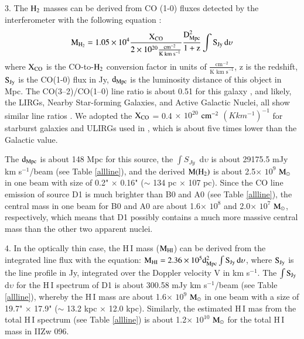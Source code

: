 \documentclass[]{aa} %
\newcommand{\km}{\rm\; km}
\newcommand{\kmps}{\hbox{$\km\s^{-1}\,$}}
\newcommand{\K}{\rm\; K}
\newcommand{\kms}{km s$^{-1}$\xspace}
\newcommand{\HI}{{\rm H\,{\scriptsize I}}\xspace}
\begin{document}
3.
The $\rm H_{2}$ masses can be derived from CO (1-0) fluxes detected by the interferometer with the following equation \citep{2017ApJ...836..130R,1991ApJ...370..172P}:
 \begin{equation}
\rm M_{H_{2}} = 1.05\times 10^{4} \frac{\rm X_{CO}}{2\times 10^{20} \frac{\textrm{cm}^{-2}}{\textrm{K km s}^{-1}}}\frac{\rm D_{Mpc}^{2}}{1+z}\int S_{Jy}\, d\upsilon
\end{equation}
 where $\rm X_{CO}$ is the CO-to-$\rm H_{2}$ conversion factor in units of $\frac{\textrm{cm}^{-2}}{\textrm{K km s}^{-1}}$, z is the redshift, $\rm S_{Jy}$ is the CO(1-0) flux in Jy, $\rm d_{Mpc}$ is the luminosity distance of this object in Mpc. The CO(3–2)/CO(1–0) line ratio is about 0.51 for this galaxy \citep{2010MNRAS.406.1364L}, and likely, the LIRGs, Nearby Star-forming Galaxies, and Active Galactic Nuclei, all show similar line ratios \citep[see][]{2010MNRAS.406.1364L,2020ApJ...889..103L}. We adopted the $\rm X_{CO}$ = 0.4 $\times$ $10^{20}$ $\rm cm^{-2}$ $(K km^{-1})^{-1}$ for starburst galaxies and ULIRGs used in \cite{2017ApJ...836..130R,1998ApJ...507..615D}, which is about five times lower than the Galactic value.

 The $\rm d_{Mpc}$ is about 148 Mpc for this source, the $\int S_{Jy}$\, d$\upsilon$ is about 29175.5 mJy \kms /beam (see Table \ref{allline}), and the derived $\rm M(H_{2})$ is about 2.5$\times$ $10^{9}$ $\rm M_{\odot}$ in one beam with size of 0.2" $\times$ 0.16"  ($\sim$ 134 pc $\times$ 107 pc). Since the CO line emission of source D1 is much brighter than B0 and A0 (see Table \ref{allline}), the central mass in one beam for B0 and A0 are about 1.6$\times$ $10^{8}$ and 2.0$\times$ $10^{7}$ $\rm M_{\odot}$, respectively, which means that D1 possibly contains a much more massive central mass than the other two apparent nuclei.

4. In the optically thin case, the \HI mass ($\rm M_{HI}$) can be derived from the integrated line flux with the equation:
    $\rm M_{HI}=2.36\times10^{5}\rm d^{2}_{Mpc}\int S_{Jy}\, d\upsilon$, where $\rm S_{Jy}$ is the line profile in Jy, integrated over the Doppler velocity V in \kms.  The $\rm \int S_{Jy}$\, d$\upsilon$ for the \HI spectrum of D1 is about 300.58 mJy \kms /beam (see Table \ref{allline}), whereby the \HI mass are about 1.6$ \times$ $10^{9}$ $\rm M_{\odot}$ in one beam with a size of 19.7" $\times$ 17.9" ($\sim$ 13.2 kpc $\times$ 12.0 kpc). Similarly, the estimated \HI mas from the total \HI spectrum (see Table \ref{allline}) is about 1.2$ \times$ $10^{10}$ $\rm M_{\odot}$ for the total \HI mass in IIZw 096.
\end{document}
